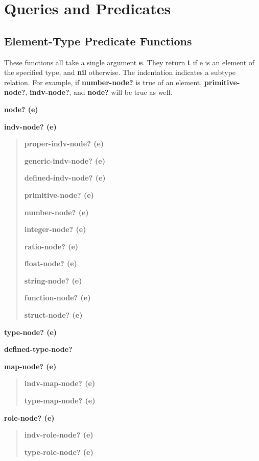 \documentclass[titlepage,twoside,openright,11pt]{article}
\begin{document}
\section{Queries and Predicates}\label{queries-and-predicates}

\subsection{Element-Type Predicate
Functions}\label{element-type-predicate-functions}

These functions all take a single argument \textbf{e}. They return
\textbf{t} if e is an element of the specified type, and \textbf{nil}
otherwise. The indentation indicates a subtype relation. For example, if
\textbf{number-node?} is true of an element, \textbf{primitive-node?},
\textbf{indv-node?}, and \textbf{node?} will be true as well.

\textbf{node? (e)}

\textbf{indv-node? (e)}

\begin{quote}
\textbf{proper-indv-node? (e)}

\textbf{generic-indv-node? (e)}

\textbf{defined-indv-node? (e)}

\textbf{primitive-node? (e)}

\textbf{number-node? (e)}

\textbf{integer-node? (e)}

\textbf{ratio-node? (e)}

\textbf{float-node? (e)}

\textbf{string-node? (e)}

\textbf{function-node? (e)}

\textbf{struct-node? (e)}
\end{quote}

\textbf{type-node? (e)}

\textbf{defined-type-node?}

\textbf{map-node? (e)}

\begin{quote}
\textbf{indv-map-node? (e)}

\textbf{type-map-node? (e)}
\end{quote}

\textbf{role-node? (e)}

\begin{quote}
\textbf{indv-role-node? (e)}

\textbf{type-role-node? (e)\\
}
\end{quote}
\end{document}
